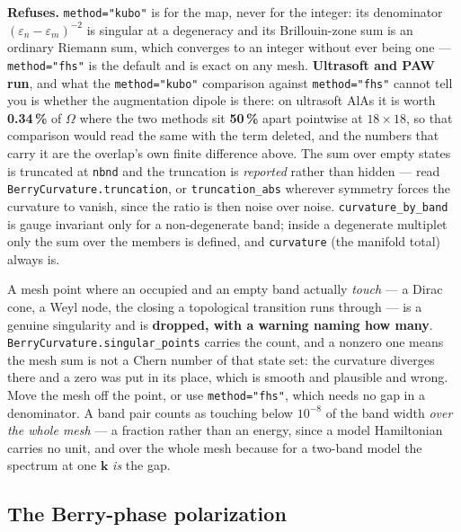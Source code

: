 \documentclass[11pt,a4paper]{article}
\newcommand{\code}[1]{\texttt{\small #1}}
\begin{document}
\begin{refuses}
\textbf{Refuses.} \code{method="kubo"} is for the map, never for the integer:
its denominator $(\varepsilon_n-\varepsilon_m)^{-2}$ is singular at a degeneracy
and its Brillouin-zone sum is an ordinary Riemann sum, which converges to an
integer without ever being one --- \code{method="fhs"} is the default and is
exact on any mesh. \textbf{Ultrasoft and PAW run}, and what the
\code{method="kubo"} comparison against \code{method="fhs"} cannot tell you is
whether the augmentation dipole is there: on ultrasoft AlAs it is worth
\textbf{0.34\,\%} of $\Omega$ where the two methods sit \textbf{50\,\%} apart
pointwise at $18\times18$, so that comparison would read the same with the term
deleted, and the numbers that carry it are the overlap's own finite difference
above. The sum over empty states is
truncated at \code{nbnd} and the truncation is \emph{reported} rather than
hidden --- read \code{BerryCurvature.truncation}, or \code{truncation\_abs}
wherever symmetry forces the curvature to vanish, since the ratio is then noise
over noise. \code{curvature\_by\_band} is gauge invariant only for a
non-degenerate band; inside a degenerate multiplet only the sum over the members
is defined, and \code{curvature} (the manifold total) always is.

A mesh point where an occupied and an empty band actually \emph{touch} --- a
Dirac cone, a Weyl node, the closing a topological transition runs through ---
is a genuine singularity and is \textbf{dropped, with a warning naming how
many}. \code{BerryCurvature.singular\_points} carries the count, and a nonzero
one means the mesh sum is not a Chern number of that state set: the curvature
diverges there and a zero was put in its place, which is smooth and plausible
and wrong. Move the mesh off the point, or use \code{method="fhs"}, which
needs no gap in a denominator. A band pair counts as touching below
$10^{-8}$ of the band width \emph{over the whole mesh} --- a fraction rather
than an energy, since a model Hamiltonian carries no unit, and over the whole
mesh because for a two-band model the spectrum at one $\mathbf k$ \emph{is}
the gap.
\end{refuses}

\subsection{The Berry-phase polarization}
\end{document}
